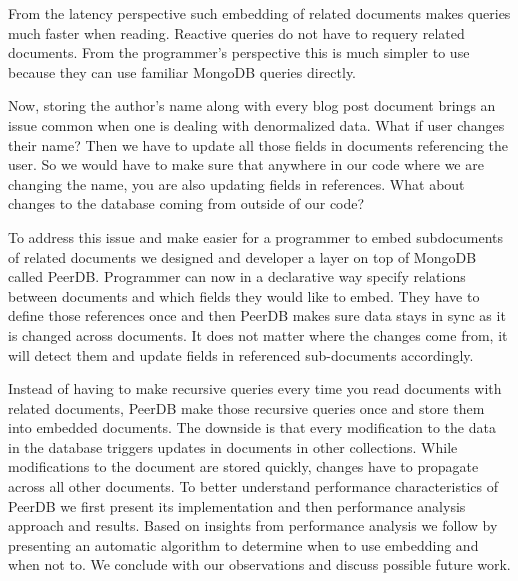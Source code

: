 From the latency perspective such embedding of related documents makes queries much faster when reading.
Reactive queries do not have to requery related documents.
From the programmer's perspective this is much simpler to use because they can use familiar MongoDB queries directly.

Now, storing the author's name along with every blog post document brings an issue common when one is dealing with denormalized data.
What if user changes their name?
Then we have to update all those fields in documents referencing the user.
So we would have to make sure that anywhere in our code where we are changing the name, you are also updating fields in references.
What about changes to the database coming from outside of our code?

To address this issue and make easier for a programmer to embed subdocuments of related documents we designed and developer a layer on top of MongoDB called PeerDB.
Programmer can now in a declarative way specify relations between documents and which fields they would like to embed.
They have to define those references once and then PeerDB makes sure data stays in sync as it is changed across documents.
It does not matter where the changes come from, it will detect them and update fields in referenced sub-documents accordingly.

Instead of having to make recursive queries every time you read documents with related documents, PeerDB make those recursive queries once and store them into embedded documents.
The downside is that every modification to the data in the database triggers updates in documents in other collections.
While modifications to the document are stored quickly, changes have to propagate across all other documents.
To better understand performance characteristics of PeerDB we first present its implementation and then performance analysis approach and results.
Based on insights from performance analysis we follow by presenting an automatic algorithm to determine when to use embedding and when not to.
We conclude with our observations and discuss possible future work.
